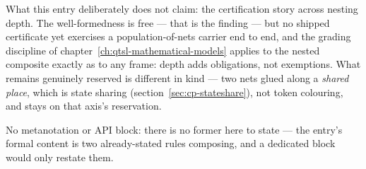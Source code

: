 What this entry deliberately does not claim: the certification story
across nesting depth. The well-formedness is free --- that is the
finding --- but no shipped certificate yet exercises a
population-of-nets carrier end to end, and the grading discipline of
chapter~\ref{ch:qtsl-mathematical-models} applies to the nested composite
exactly as to any frame: depth adds obligations, not exemptions.
What remains genuinely reserved is different in kind --- two nets
glued along a \emph{shared place}, which is state sharing
(section~\ref{sec:cp-stateshare}), not token colouring, and stays on
that axis's reservation.

No metanotation or API block: there is no former here to state ---
the entry's formal content is two already-stated rules composing, and
a dedicated block would only restate them.
